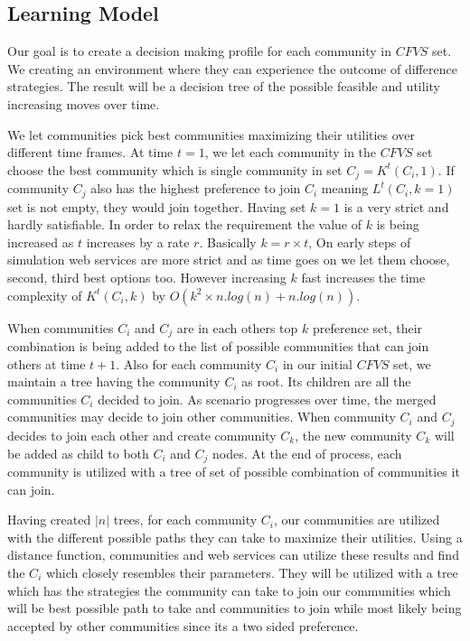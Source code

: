\documentclass[10pt,journal,cspaper,compsoc]{IEEEtran}
\begin{document}
\subsection{Learning Model}\label{ss:learningmodel}

Our goal is to create a decision making profile for each community in $CFVS$ set. We creating an environment where they can experience the outcome of difference strategies. The result will be a decision tree of the possible feasible and utility increasing moves over time.

We let communities pick best communities maximizing their utilities over different time frames. At time $t = 1$, we let each community in the $CFVS$ set choose the best community which is single community in set $C_j = K^t(C_i, 1)$. If community $C_j$ also has the highest preference to join $C_i$ meaning $L^t(C_i, k=1)$ set is not empty, they would join together. Having set $k = 1$ is a very strict and hardly satisfiable. In order to relax the requirement the value of $k$ is being increased as $t$ increases by a rate $r$. Basically $k = r \times t$, On early steps of simulation web services are more strict and as time goes on we let them choose, second, third best options too. However increasing $k$ fast increases the time complexity of $K^t(C_i, k)$ by $O(k^2 \times n.log(n) + n.log(n))$. 

When communities $C_i$ and $C_j$ are in each others top $k$ preference set, their combination is being added to the list of possible communities that can join others at time $t+1$. Also for each community $C_i$ in our initial $CFVS$ set, we maintain a tree having the community $C_i$ as root. Its children are all the communities $C_i$ decided to join. As scenario progresses over time, the merged communities may decide to join other communities. When community $C_i$ and $C_j$ decides to join each other and create community $C_k$, the new community $C_k$ will be added as child to both $C_i$ and $C_j$ nodes. At the end of process, each community is utilized with a tree of set of possible combination of communities it can join.

Having created $|n|$ trees, for each community $C_i$, our communities are utilized with the different possible paths they can take to maximize their utilities. Using a distance function, communities and web services can utilize these results and find the $C_i$ which closely resembles their parameters. They will be utilized with a tree which has the strategies the community can take to join our communities which will be best possible path to take and communities to join while most likely being accepted by other communities since its a two sided preference.
\end{document}
